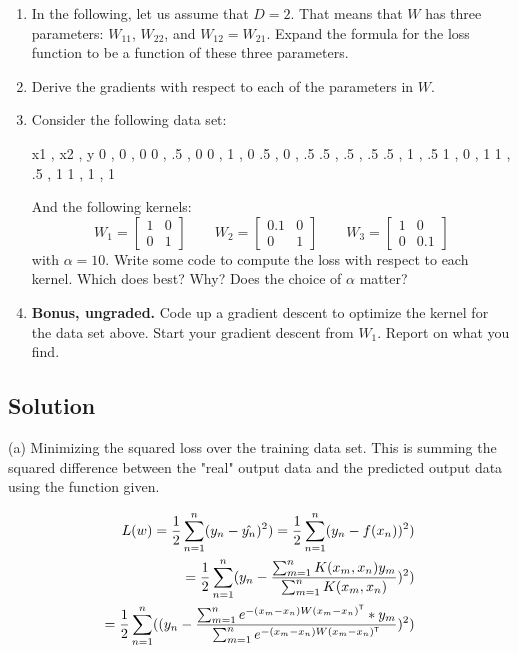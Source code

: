 \documentclass[submit]{harvardml}
\begin{document}
\begin{problem}
\begin{enumerate}
\item In the following, let us assume that $D = 2$.  That means that
  $W$ has three parameters: $W_{11}$, $W_{22}$, and $W_{12} = W_{21}$.
  Expand the formula for the loss function to be a function of these
  three parameters.

\item Derive the gradients with respect to each of the parameters in
  $W$.

\item Consider the following data set:
\begin{csv}
x1 , x2 , y 
  0 , 0 , 0
  0 , .5 , 0
  0 , 1 , 0 
  .5 , 0 , .5
  .5 , .5 , .5
  .5 , 1 , .5
  1 , 0 , 1
  1 , .5 , 1
  1 , 1 , 1 
\end{csv}
And the following kernels:
\begin{equation*} 
W_1 = \begin{bmatrix}
  1 & 0 \\
  0 & 1 
\end{bmatrix}
\qquad
W_2 = \begin{bmatrix}
  0.1 & 0 \\
  0 & 1 
\end{bmatrix}
\qquad
W_3 = \begin{bmatrix}
  1 & 0 \\
  0 & 0.1 
\end{bmatrix}
\end{equation*} 
with $\alpha = 10$. Write some code to compute the loss with respect
to each kernel.  Which does best?  Why?  Does the choice of $\alpha$
matter? 


\item \textbf{Bonus, ungraded.}  Code up a gradient descent to
  optimize the kernel for the data set above.  Start your gradient
  descent from $W_1$.  Report on what you find.
  
\end{enumerate}

\end{problem}
\pagebreak
\subsection*{Solution}

\bigskip \noindent (a) Minimizing the squared loss over the training data set. This is summing the squared difference between the "real" output data and the predicted output data using the function given.

\begin{align*}
L(w) = \frac{1}{2}\sum_{n=1}^n (y_n - \hat{y_n})^{2}) = \frac{1}{2}\sum_{n=1}^n (y_n - f(x_n))^{2}) \\
= \frac{1}{2}\sum_{n=1}^n (y_n - \frac{\sum_{m=1}^n K(x_m, x_n) y_m}{\sum_{m=1}^n K(x_m, x_n)})^{2}) \\
= \frac{1}{2}\sum_{n=1}^n ((y_n - \frac{\sum_{m=1}^n e^{-(x_m - x_n)W(x_m - x_n)^{\mathsf{T}}} *y_m}{\sum_{m=1}^n e^{{-(x_m - x_n)W(x_m - x_n)^{\mathsf{T}}}}})^{2})
\end{align*}
\end{document}
